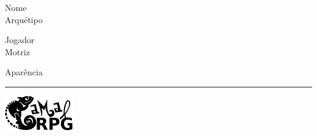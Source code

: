 \documentclass[a4paper,12pt]{article}
\begin{document}
	\begin{minipage}[t][][t]{\linewidth}
		\begin{minipage}[t][][t]{\dimexpr(\linewidth-3.2cm)\relax}
			\begin{minipage}[t][][t]{.5\linewidth}
				Nome \hrulefill \\
				Arqu\'{e}tipo \hrulefill
			\end{minipage}%
			\hspace{.01\linewidth}%
			\begin{minipage}[t][][t]{.49\linewidth}
				Jogador \hrulefill \\
				Motriz \hrulefill
			\end{minipage}
			Apar\^{e}ncia \hrulefill \\
			\rule{\linewidth}{.5pt}
		\end{minipage}%
		\hspace{.2cm}%
		\begin{minipage}[t][][t]{3cm}
			\includegraphics[width=3cm, valign=t]{"img/Camal RPG"}
		\end{minipage}
	\end{minipage}\\
	
\end{document}
